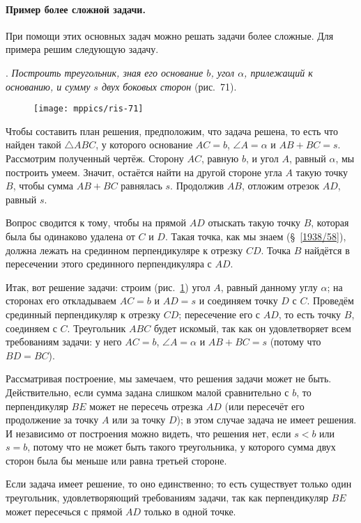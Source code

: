 \paragraph{Пример более сложной задачи.}\label{1938/68}
При помощи этих основных задач можно решать задачи более сложные.
Для примера решим следующую задачу.

\smallskip
{}.
\emph{Построить треугольник, зная его основание $b$, угол $\alpha$, прилежащий к основанию, и сумму $s$ двух боковых сторон} (рис.~71).

\begin{figure}[!ht]
\centering
\texttt{[image: mppics/ris-71]}
\caption{}\label{1938/ris-71}
\end{figure}

Чтобы составить план решения, предположим, что задача решена, то есть что найден такой $\triangle ABC$, у которого основание $AC = b$, $\angle A=\alpha$ и $AB+BC=s$.
Рассмотрим полученный чертёж.
Сторону $AC$, равную $b$, и угол $A$, равный $\alpha$, мы построить умеем.
Значит, остаётся найти на другой стороне угла $A$ такую точку $B$, чтобы сумма $AB+BC$ равнялась $s$.
Продолжив $AB$, отложим отрезок $AD$, равный $s$.

Вопрос сводится к тому, чтобы на прямой $AD$ отыскать такую точку $B$, которая была бы одинаково удалена от $C$ и $D$.
Такая точка, как мы знаем (§~\ref{1938/58}), должна лежать на срединном перпендикуляре к отрезку $CD$. 
Точка $B$ найдётся в пересечении этого срединного перпендикуляра с $AD$. 

Итак, вот решение задачи:
строим (рис.~\ref{1938/ris-71}) угол $A$, равный данному углу $\alpha$;
на сторонах его откладываем $AC=b$ и $AD=s$ и соединяем точку $D$ с $C$.
Проведём срединный перпендикуляр к отрезку $CD$;
пересечение его с $AD$, то есть точку $B$, соединяем с $C$.
Треугольник $ABC$ будет  искомый, так как он удовлетворяет всем требованиям задачи:
у него $AC=b$, $\angle A = \alpha$ и $AB+BC=s$ (потому что $BD=BC$).

Рассматривая построение, мы замечаем, что решения задачи может не быть.
Действительно, если сумма задана слишком малой сравнительно с $b$, то перпендикуляр $BE$ может не пересечь отрезка $AD$ (или пересечёт его продолжение за точку $A$ или за точку $D$);
в этом случае задача не имеет решения.
И независимо от построения можно видеть, что решения нет, если $s<b$ или $s=b$, потому что не может быть такого треугольника, у которого сумма двух сторон была бы меньше или равна третьей стороне.

Если задача имеет решение, то оно единственно;
то есть существует только один треугольник, удовлетворяющий требованиям задачи, так как перпендикуляр $BE$ может пересечься с прямой $AD$ только в одной точке.


